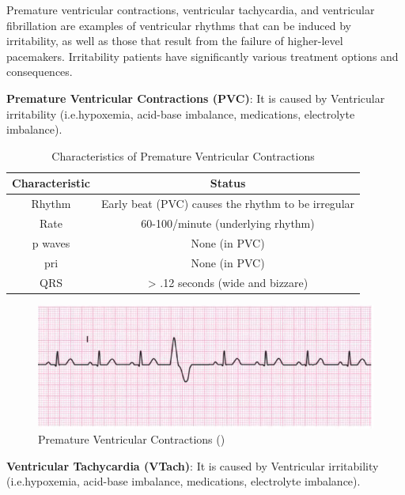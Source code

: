 Premature ventricular contractions, ventricular tachycardia, and ventricular fibrillation are examples of ventricular rhythms that can be induced by irritability, as well as those that result from the failure of higher-level pacemakers. Irritability patients have significantly various treatment options and consequences.

\textbf{Premature Ventricular Contractions (PVC)}: It is caused by Ventricular irritability (i.e.hypoxemia, acid-base imbalance, medications, electrolyte imbalance).

\begin{table}[H]
\begin{center}
\begin{tabular}{||c || c||}
 \hline
\textbf{Characteristic} & \textbf{Status} \\ [0.4ex] 
 \hline\hline
 Rhythm & Early beat (PVC) causes the rhythm to be irregular \\
\hline
Rate & 60-100/minute (underlying rhythm) \\
\hline
p waves & None (in PVC) \\
\hline
pri & None (in PVC) \\
\hline
QRS & > .12 seconds (wide and bizzare) \\
\hline\hline
\end{tabular}
\end{center}
\caption{Characteristics of Premature Ventricular Contractions}
\label{table:PVC_characteristics}
\end{table}

 \begin{figure}[H]
\centering
\includegraphics[scale=0.8]{img/PVC.png}
\caption{Premature Ventricular Contractions (\cite{arryth_types})}
\label{fig:PVC}
\end{figure}

\textbf{Ventricular Tachycardia (VTach)}: It is caused by Ventricular irritability (i.e.hypoxemia, acid-base imbalance, medications, electrolyte
imbalance).

